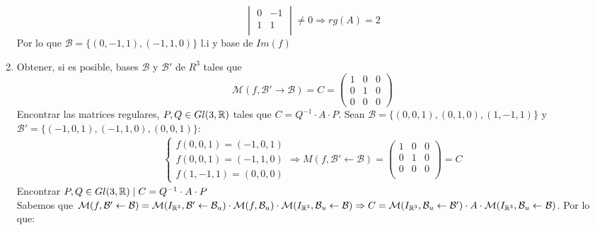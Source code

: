 \documentclass[12pt]{article}
\begin{document}
\begin{ejercicio}[4 puntos]
\begin{enumerate}[label=\alph*.]
\begin{equation*}
\begin{vmatrix}
                    0 & -1 \\
                    1 & 1 \\
                \end{vmatrix} \neq 0 \Rightarrow rg(A) = 2
            \end{equation*}
             Por lo que $\mathcal{B} = \{(0, -1, 1), (-1, 1, 0)\}$ l.i  y base de $ Im(f)$ \\
        \item Obtener, si es posible, bases $\mathcal{B}$ y $\mathcal{B}'$ de $R^3$ tales que
            \begin{equation*}
                \mathcal{M}(f, \mathcal{B'} \rightarrow \mathcal{B}) = C = \begin{pmatrix}
                    1 & 0 & 0 \\
                    0 & 1 & 0 \\
                    0 & 0 & 0
                \end{pmatrix}
            \end{equation*}
            Encontrar las matrices regulares, $P, Q \in Gl(3, {\mathbb{R}})$ tales que $C = Q^{-1} \cdot A \cdot P$.
        \noindent
        Sean $\mathcal{B} = \{(0, 0, 1), (0, 1, 0), (1, -1, 1)\}$ y $\mathcal{B'} = \{(-1, 0, 1), (-1, 1, 0), (0, 0, 1)\} $:
        \begin{gather*}
                \left\{\begin{array}{ll}
                    f(0, 0, 1) = (-1, 0, 1) \\
                    f(0, 0, 1) = (-1, 1, 0) \\
                    f(1, -1, 1) = (0, 0, 0) 
                \end{array}\right. \Rightarrow M(f, \mathcal{B'} \leftarrow \mathcal{B}) = \begin{pmatrix}
                    1 & 0 & 0 \\
                    0 & 1 & 0 \\
                    0 & 0 & 0 \\
                \end{pmatrix} = C
        \end{gather*}
        Encontrar $P, Q \in Gl(3, {\mathbb{R}}) \mid C = Q^{-1} \cdot A \cdot P$ \\
        Sabemos que $\mathcal{M} (f, \mathcal{B}' \leftarrow \mathcal{B}) = \mathcal{M}(I_{{\mathbb{R}}^3}, \mathcal{B'} \leftarrow \mathcal{B}_u) \cdot \mathcal{M}(f, \mathcal{B}_u) \cdot {\mathcal{M}(I_{{\mathbb{R}}^3}, \mathcal{B}_u \leftarrow \mathcal{B})} \Rightarrow C = \mathcal{M}(I_{{\mathbb{R}}^3}, \mathcal{B}_u \leftarrow \mathcal{B'}) \cdot A \cdot \mathcal{M}(I_{{\mathbb{R}}^3}, \mathcal{B}_u \leftarrow \mathcal{B})$. Por lo que:

\end{enumerate}
\end{ejercicio}
\end{document}
